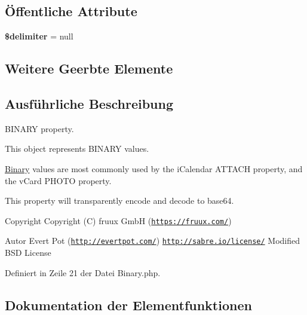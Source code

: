 \subsection*{Öffentliche Attribute}
\begin{DoxyCompactItemize}
\item 
\mbox{\label{class_sabre_1_1_v_object_1_1_property_1_1_binary_aae19e608892973e52cd41d5acb8c8e8f}} 
{\bfseries \$delimiter} = null
\end{DoxyCompactItemize}
\subsection*{Weitere Geerbte Elemente}


\subsection{Ausführliche Beschreibung}
B\+I\+N\+A\+RY property.

This object represents B\+I\+N\+A\+RY values.

\mbox{\hyperlink{class_sabre_1_1_v_object_1_1_property_1_1_binary}{Binary}} values are most commonly used by the i\+Calendar A\+T\+T\+A\+CH property, and the v\+Card P\+H\+O\+TO property.

This property will transparently encode and decode to base64.

\begin{DoxyCopyright}{Copyright}
Copyright (C) fruux GmbH (\href{https://fruux.com/}{\tt https\+://fruux.\+com/}) 
\end{DoxyCopyright}
\begin{DoxyAuthor}{Autor}
Evert Pot (\href{http://evertpot.com/}{\tt http\+://evertpot.\+com/})  \href{http://sabre.io/license/}{\tt http\+://sabre.\+io/license/} Modified B\+SD License 
\end{DoxyAuthor}


Definiert in Zeile 21 der Datei Binary.\+php.



\subsection{Dokumentation der Elementfunktionen}
\mbox{\label{class_sabre_1_1_v_object_1_1_property_1_1_binary_af8df06094c2b594cf0a9fa60bc156ed3}} 
